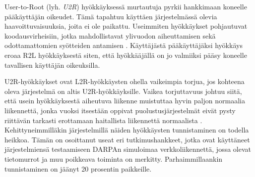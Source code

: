 User-to-Root (lyh. \textit{U2R}) hyökkäyksessä murtautuja pyrkii hankkimaan
koneelle pääkäyttäjän oikeudet. Tämä tapahtuu käyttäen järjestelmässä
olevia haavoittuvaisuuksia, joita ei ole paikattu. Useimmiten
hyökkäykset pohjautuvat koodausvirheisiin, jotka mahdollistavat
ylivuodon aiheuttamisen sekä odottamattomien syötteiden antamisen
\cite{IDS}. Käyttäjästä pääkäyttäjäksi hyökkäys eroaa R2L hyökkäyksestä
siten, että hyökkääjällä on jo valmiiksi pääsy koneelle tavallisen
käyttäjän oikeuksilla.

U2R-hyökkäykset ovat L2R-hyökkäysten ohella vaikeimpia torjua, jos kohteena
oleva järjestelmä on altis U2R-hyökkäyksille. Vaikea torjuttavuus johtuu siitä, että
usein hyökkäyksestä aiheutuva liikenne muistuttaa hyvin paljon normaalia
liikennettä, jonka vuoksi itsestään oppivat puolustusjärjestelmät eivät pysty
riittävän tarkasti erottamaan haitallista liikennettä normaalista \cite{U2R}.
Kehittyneimmilläkin järjestelmillä näiden hyökkäysten tunnistaminen on todella
heikkoa. Tämän on osoittanut useat eri tutkimushankkeet, jotka ovat käyttäneet
järjestelmiensä testaamiseen DARPAn simuloimaa verkkoliikennettä,
jossa olevat tietomurrot ja muu poikkeava toiminta on merkitty.
Parhaimmillaankin tunnistaminen on jäänyt 20 prosentin
paikkeille.

